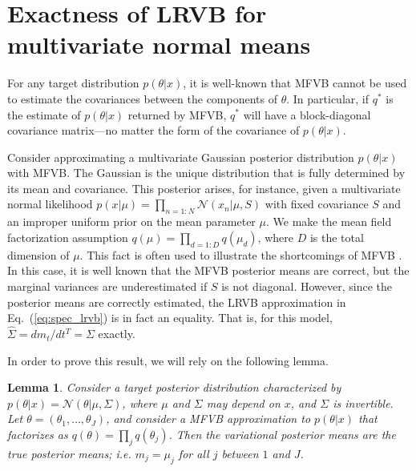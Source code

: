 \documentclass{article}\usepackage[]{graphicx}\usepackage[]{color}
\newcommand{\eq}[1]{Eq.~(\ref{eq:#1})}
\newcommand{\mpq}{m} %
\newcommand{\gauss}{\mathcal{N}} %
\newcommand{\truecov}{\Sigma} %
\newcommand{\lrcov}{\hat{\Sigma}} %
\newtheorem{lemma}[theorem]{Lemma}
\begin{document}

\section{Exactness of LRVB for multivariate normal means} \label{app:mvn_exact}

For any target distribution $p(\theta | x)$, it is well-known that MFVB cannot
be used to estimate the covariances between the components of $\theta$. In
particular, if $q^*$ is the estimate of $p(\theta | x)$ returned by MFVB, $q^*$
will have a block-diagonal covariance matrix---no matter the form of the
covariance of $p(\theta | x)$.

Consider approximating a multivariate Gaussian posterior distribution
$p(\theta|x)$ with MFVB. The Gaussian is the unique distribution that is fully
determined by its mean and covariance. This posterior arises, for instance,
given a multivariate normal likelihood $p(x | \mu) = \prod_{n=1:N} \gauss(x_n |
\mu, S)$ with fixed covariance $S$ and an improper uniform prior on the mean
parameter $\mu$. We make the mean field factorization assumption
$q(\mu)=\prod_{d=1:D} q(\mu_d)$, where $D$ is the total dimension of $\mu$. This
fact is often used to illustrate the shortcomings of MFVB
\citep{wang:2005:inadequacy,bishop:2006:pattern,turner:2011:two}.
In this case, it is well known that the MFVB posterior means are correct, but the
marginal variances are underestimated if $S$ is not diagonal.
However, since the posterior means are correctly estimated,
the LRVB approximation in \eq{spec_lrvb} is in fact an equality.
That is, for this model,
$\lrcov = d \mpq_t / d t^T = \truecov$ exactly.

In order to prove this result, we will rely on the following lemma.
%
\begin{lemma} \label{lem:lrvb_mvn}
%
  Consider a target posterior distribution characterized by $p(\theta | x) =
  \gauss(\theta | \mu, \Sigma)$, where $\mu$ and $\Sigma$ may depend on $x$, and
  $\Sigma$ is invertible. Let $\theta = (\theta_{1}, \ldots, \theta_{J})$, and
  consider a MFVB approximation to $p(\theta| x)$ that factorizes as $q(\theta) =
  \prod_{j} q(\theta_j)$. Then the variational posterior means are the true
  posterior means; i.e. $m_j = \mu_j$ for all $j$ between $1$ and $J$.
%
\end{lemma}
\end{document}
